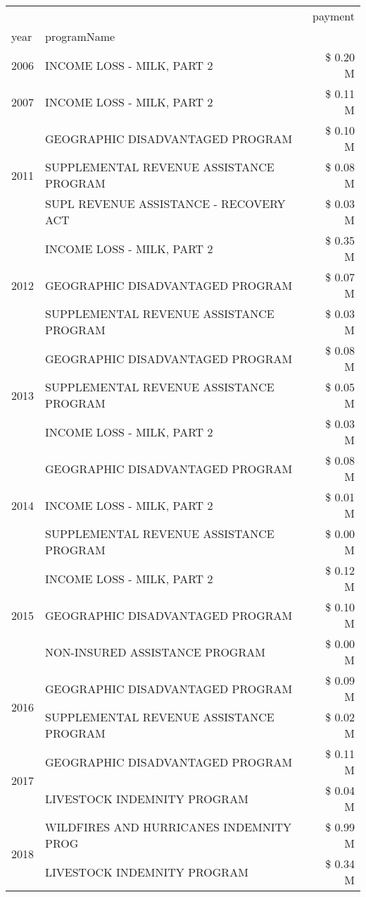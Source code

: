 \begin{tabular}{llr}
\toprule
 &  & payment \\
year & programName &  \\
\midrule
2006 & INCOME LOSS - MILK, PART 2 & \$ 0.20 M \\
\cline{1-3}
2007 & INCOME LOSS - MILK, PART 2 & \$ 0.11 M \\
\cline{1-3}
\multirow[t]{3}{*}{2011} & GEOGRAPHIC DISADVANTAGED PROGRAM & \$ 0.10 M \\
 & SUPPLEMENTAL REVENUE ASSISTANCE PROGRAM & \$ 0.08 M \\
 & SUPL REVENUE ASSISTANCE - RECOVERY ACT & \$ 0.03 M \\
\cline{1-3}
\multirow[t]{3}{*}{2012} & INCOME LOSS - MILK, PART 2 & \$ 0.35 M \\
 & GEOGRAPHIC DISADVANTAGED PROGRAM & \$ 0.07 M \\
 & SUPPLEMENTAL REVENUE ASSISTANCE PROGRAM & \$ 0.03 M \\
\cline{1-3}
\multirow[t]{3}{*}{2013} & GEOGRAPHIC DISADVANTAGED PROGRAM & \$ 0.08 M \\
 & SUPPLEMENTAL REVENUE ASSISTANCE PROGRAM & \$ 0.05 M \\
 & INCOME LOSS - MILK, PART 2 & \$ 0.03 M \\
\cline{1-3}
\multirow[t]{3}{*}{2014} & GEOGRAPHIC DISADVANTAGED PROGRAM & \$ 0.08 M \\
 & INCOME LOSS - MILK, PART 2 & \$ 0.01 M \\
 & SUPPLEMENTAL REVENUE ASSISTANCE PROGRAM & \$ 0.00 M \\
\cline{1-3}
\multirow[t]{3}{*}{2015} & INCOME LOSS - MILK, PART 2 & \$ 0.12 M \\
 & GEOGRAPHIC DISADVANTAGED PROGRAM & \$ 0.10 M \\
 & NON-INSURED ASSISTANCE PROGRAM & \$ 0.00 M \\
\cline{1-3}
\multirow[t]{2}{*}{2016} & GEOGRAPHIC DISADVANTAGED PROGRAM & \$ 0.09 M \\
 & SUPPLEMENTAL REVENUE ASSISTANCE PROGRAM & \$ 0.02 M \\
\cline{1-3}
\multirow[t]{2}{*}{2017} & GEOGRAPHIC DISADVANTAGED PROGRAM & \$ 0.11 M \\
 & LIVESTOCK INDEMNITY PROGRAM & \$ 0.04 M \\
\cline{1-3}
\multirow[t]{3}{*}{2018} & WILDFIRES AND HURRICANES INDEMNITY PROG & \$ 0.99 M \\
 & LIVESTOCK INDEMNITY PROGRAM & \$ 0.34 M \\

\end{tabular}
